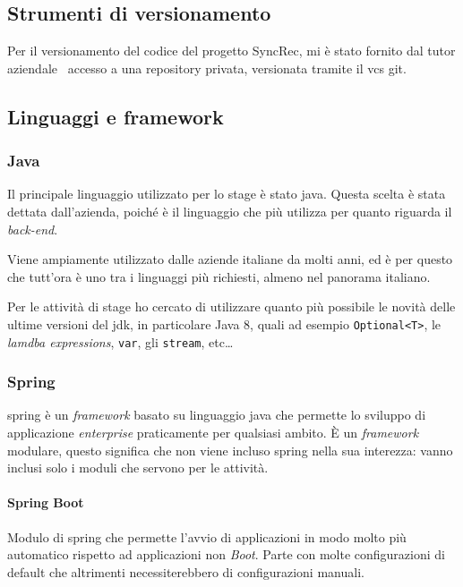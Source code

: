 \subsection{Strumenti di versionamento}

Per il versionamento del codice del progetto SyncRec, mi è stato fornito dal tutor aziendale \fabio\ accesso a una \gls{repository} privata, versionata tramite il \gls{vcs} \gls{git}.

\subsection{Linguaggi e framework}

\subsubsection{Java} Il principale linguaggio utilizzato per lo stage è stato \gls{java}. Questa scelta è stata dettata dall'azienda, poiché è il linguaggio che più utilizza per quanto riguarda il \textit{back-end}.

Viene ampiamente utilizzato dalle aziende italiane da molti anni, ed è per questo che tutt'ora è uno tra i linguaggi più richiesti, almeno nel panorama italiano.

Per le attività di stage ho cercato di utilizzare quanto più possibile le novità delle ultime versioni del \gls{jdk}, in particolare Java 8, quali ad esempio \texttt{Optional<T>}, le \textit{lamdba expressions}, \texttt{var}, gli \texttt{stream}, etc\dots

\subsubsection{Spring}

\gls{spring} è un \textit{framework} basato su linguaggio \gls{java} che permette lo sviluppo di applicazione \textit{enterprise} praticamente per qualsiasi ambito.
È un \textit{framework} modulare, questo significa che non viene incluso \gls{spring} nella sua interezza: vanno inclusi solo i moduli che servono per le attività.

\paragraph*{Spring Boot} Modulo di \gls{spring} che permette l'avvio di applicazioni in modo molto più automatico rispetto ad applicazioni non \textit{Boot}. Parte con molte configurazioni di default che altrimenti necessiterebbero di configurazioni manuali.

